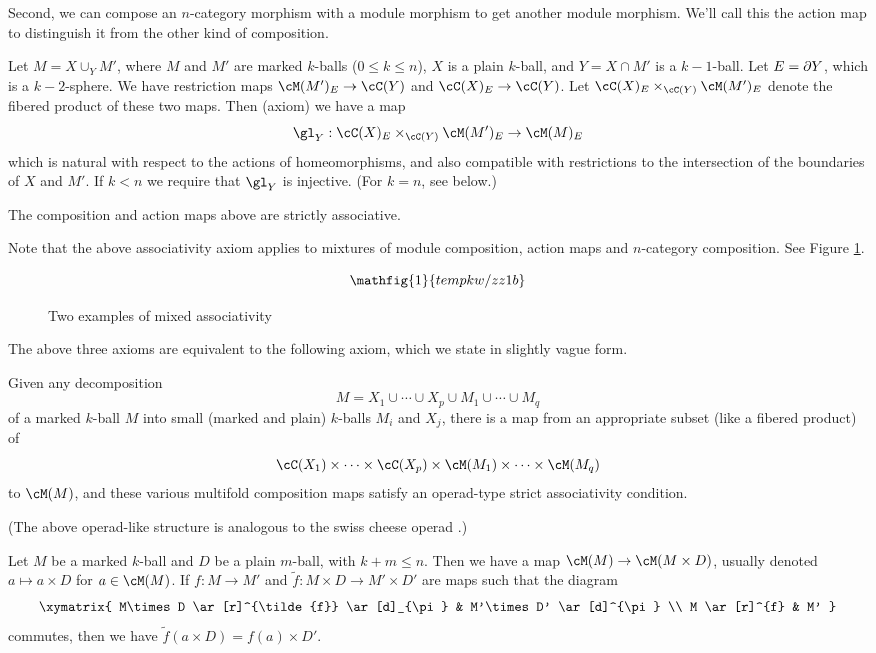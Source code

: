 Second, we can compose an $n$-category morphism with a module morphism to get another
module morphism.
We'll call this the action map to distinguish it from the other kind of composition.

{Let $M = X \cup_Y M'$, where $M$ and $M'$ are marked $k$-balls ($0\le k\le n$),
$X$ is a plain $k$-ball,
and $Y = X\cap M'$ is a $k{-}1$-ball.
Let $E = \partial Y$, which is a $k{-}2$-sphere.
We have restriction maps $\cM(M')_E \to \cC(Y)$ and $\cC(X)_E\to \cC(Y)$.
Let $\cC(X)_E \times_{\cC(Y)} \cM(M')_E$ denote the fibered product of these two maps. 
Then (axiom) we have a map
\[
	\gl_Y :\cC(X)_E \times_{\cC(Y)} \cM(M')_E \to \cM(M)_E
\]
which is natural with respect to the actions of homeomorphisms, and also compatible with restrictions
to the intersection of the boundaries of $X$ and $M'$.
If $k < n$ we require that $\gl_Y$ is injective.
(For $k=n$, see below.)}

{The composition and action maps above are strictly associative.}

Note that the above associativity axiom applies to mixtures of module composition,
action maps and $n$-category composition.
See Figure \ref{zzz1b}.

\begin{figure}[!ht]
\begin{equation*}
\mathfig{1}{tempkw/zz1b}
\end{equation*}
\caption{Two examples of mixed associativity}
\label{zzz1b}
\end{figure}


The above three axioms are equivalent to the following axiom,
which we state in slightly vague form.

{Given any decomposition 
\[
	M =  X_1 \cup\cdots\cup X_p \cup M_1\cup\cdots\cup M_q
\]
of a marked $k$-ball $M$
into small (marked and plain) $k$-balls $M_i$ and $X_j$, there is a 
map from an appropriate subset (like a fibered product) 
of 
\[
	\cC(X_1)\times\cdots\times\cC(X_p) \times \cM(M_1)\times\cdots\times\cM(M_q) 
\]
to $\cM(M)$,
and these various multifold composition maps satisfy an
operad-type strict associativity condition.}

(The above operad-like structure is analogous to the swiss cheese operad
\cite{MR1718089}.)

{Let $M$ be a marked $k$-ball and $D$ be a plain $m$-ball, with $k+m \le n$.
Then we have a map $\cM(M)\to \cM(M\times D)$, usually denoted $a\mapsto a\times D$ for $a\in \cM(M)$.
If $f:M\to M'$ and $\tilde{f}:M\times D \to M'\times D'$ are maps such that the diagram
\[ \xymatrix{
	M\times D \ar[r]^{\tilde{f}} \ar[d]_{\pi} & M'\times D' \ar[d]^{\pi} \\
	M \ar[r]^{f} & M'
} \]
commutes, then we have $\tilde{f}(a\times D) = f(a)\times D'$.}

